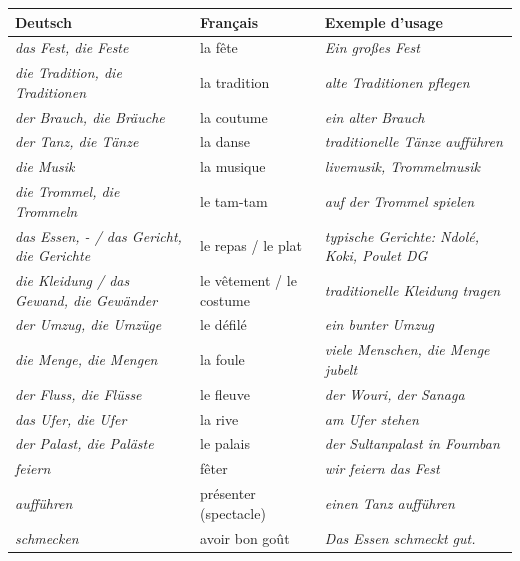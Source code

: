 \documentclass[11pt]{article}
\newcommand{\all}[1]{\ifmmode\text{\textit{#1}}\else\begingroup\selectlanguage{ngerman}\itshape #1\endgroup\fi}
\begin{document}
\begin{definition}
\begin{center}
\begin{tabularx}{\linewidth}{|l|l|X|}
\hline
\rowcolor{poporangeL} \textbf{Deutsch} & \textbf{Français} & \textbf{Exemple d'usage} \\
\hline
\all{das Fest, die Feste} & la fête & \all{Ein großes Fest} \\
\all{die Tradition, die Traditionen} & la tradition & \all{alte Traditionen pflegen} \\
\all{der Brauch, die Bräuche} & la coutume & \all{ein alter Brauch} \\
\all{der Tanz, die Tänze} & la danse & \all{traditionelle Tänze aufführen} \\
\all{die Musik} & la musique & \all{livemusik, Trommelmusik} \\
\all{die Trommel, die Trommeln} & le tam-tam & \all{auf der Trommel spielen} \\
\all{das Essen, -} / \all{das Gericht, die Gerichte} & le repas / le plat & \all{typische Gerichte: Ndolé, Koki, Poulet DG} \\
\all{die Kleidung} / \all{das Gewand, die Gewänder} & le vêtement / le costume & \all{traditionelle Kleidung tragen} \\
\all{der Umzug, die Umzüge} & le défilé & \all{ein bunter Umzug} \\
\all{die Menge, die Mengen} & la foule & \all{viele Menschen, die Menge jubelt} \\
\all{der Fluss, die Flüsse} & le fleuve & \all{der Wouri, der Sanaga} \\
\all{das Ufer, die Ufer} & la rive & \all{am Ufer stehen} \\
\all{der Palast, die Paläste} & le palais & \all{der Sultanpalast in Foumban} \\
\all{feiern} & fêter & \all{wir feiern das Fest} \\
\all{aufführen} & présenter (spectacle) & \all{einen Tanz aufführen} \\
\all{schmecken} & avoir bon goût & \all{Das Essen schmeckt gut.} \\
\hline
\end{tabularx}
\end{center}
\end{definition}
\end{document}
